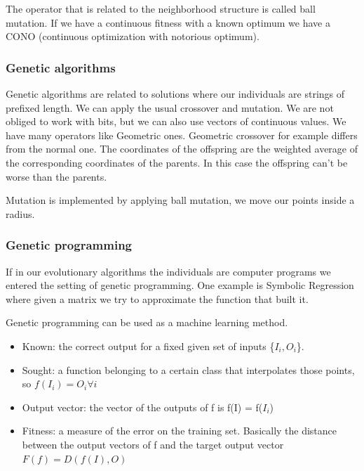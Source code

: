 \vspace{10pt}
The operator that is related to the neighborhood structure is called ball mutation. If we have a continuous fitness with a known optimum we have a CONO (continuous optimization with notorious optimum). 

\subsubsection{Genetic algorithms}

Genetic algorithms are related to solutions where our individuals are strings of prefixed length. We can apply the usual crossover and mutation. We are not obliged to work with bits, but we can also use vectors of continuous values. We have many operators like Geometric ones. 
Geometric crossover for example differs from the normal one. The coordinates of the offspring are the weighted average of the corresponding coordinates of the parents. In this case the offspring can't be worse than the parents. 

\vspace{10pt}

Mutation is implemented by applying ball mutation, we move our points inside a radius. 


\subsubsection{Genetic programming}

If in our evolutionary algorithms the individuals are computer programs we entered the setting of genetic programming. One example is Symbolic Regression where given a matrix we try to approximate the function that built it. 

\vspace{10pt}

Genetic programming can be used as a machine learning method. 

\begin{itemize}
    \item Known: the correct output for a fixed given set of inputs \{$I_i, O_i$\}. 
    \item Sought: a function belonging to a certain class that interpolates those points, so $f(I_i) = O_i \forall i$
    \item Output vector: the vector of the outputs of f is f(I) = f($I_i$)
    \item Fitness: a measure of the error on the training set. Basically the distance between the output vectors of f and the target output vector $F(f) = D(f(I), O)$
\end{itemize}

